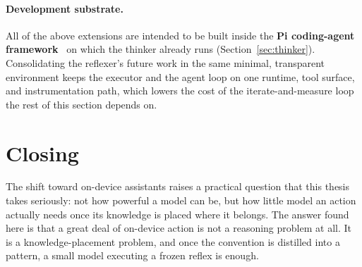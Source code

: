\paragraph{Development substrate.} All of the above extensions are intended to be
built inside the \textbf{Pi coding-agent framework}~\citep{pi-agent} on which the
thinker already runs (Section~\ref{sec:thinker}). Consolidating the reflexer's
future work in the same minimal, transparent environment keeps the executor and
the agent loop on one runtime, tool surface, and instrumentation path, which lowers
the cost of the iterate-and-measure loop the rest of this section depends on.

\section{Closing}
\label{sec:c-closing}

The shift toward on-device assistants raises a practical question that this thesis
takes seriously: not how powerful a model can be, but how little model an action
actually needs once its knowledge is placed where it belongs. The answer found
here is that a great deal of on-device action is not a reasoning problem at all. It
is a knowledge-placement problem, and once the convention is distilled into a
pattern, a small model executing a frozen reflex is enough.
